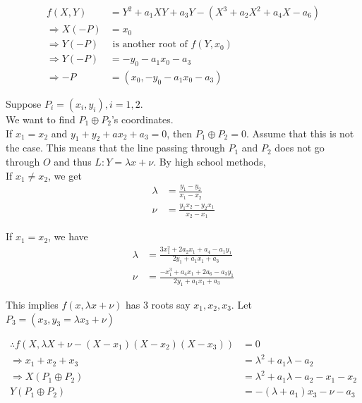 \documentclass[oneside, 12pt, ]{scrbook}
\theoremstyle{theorem}
\begin{document}
\begin{align*}
f(X,Y) &= Y^2 + a_{1}XY + a_{3}Y - (X^3 + a_{2}X^2 + a_{4}X - a_{6})\\
\Rightarrow X(-P) &= x_{0}\\
\Rightarrow Y(-P) &\text{ is another root of } f(Y,x_{0}) \\
\Rightarrow Y(-P) &= -y_{0} - a_{1}x_{0} -a_{3} \\
\Rightarrow -P &= (x_{0}, -y_{0}-a_{1}x_{0} - a_{3}) 
\end{align*}

Suppose $P_{i} = (x_{i},y_{i}), i=1,2$. \\

We want to find $P_{1} \oplus P_{2}$'s coordinates. \\

If $x_{1}=x_{2}$ and $y_{1} + y_{2} + ax_{2} + a_{3}=0$, then $P_{1} \oplus P_{2} = 0$. Assume that this is not the case. This means that the line passing through $P_{1}$ and $P_{2}$ does not go through $O$ and thus $L: Y = \lambda x + \nu$. By high school methods, \\

If $x_{1}\neq x_{2}$, we get 
\begin{align*}
\lambda &= \frac{y_{1}-y_{2}}{x_{1}-x_{2}} \\
\nu &= \frac{y_{1}x_{2} - y_{2}x_{1}}{x_{2}-x_{1}} 
\end{align*}

If $x_{1} = x_{2}$, we have 
\begin{align*}
\lambda &= \frac{3x_{1}^2 + 2a_{2}x_{1} + a_{4} - a_{1}y_{1}}{2y_{1} + a_{1}x_{1} + a_{3}} \\
\nu &= \frac{-x_{1}^3 + a_{4}x_{1} +2a_{6} -a_{3}y_{1}}{2y_{1} + a_{1}x_{1} + a_{3}}
\end{align*}

This implies $f(x, \lambda x + \nu)$ has $3$ roots say $x_{1},x_{2},x_{3}$. Let $P_{3}=(x_{3}, y_{3} = \lambda x_{3} + \nu)$

\begin{align*}
\therefore f(X,\lambda X + \nu -(X-x_{1})(X-x_{2})(X-x_{3}) ) &= 0\\
\Rightarrow x_{1} + x_{2} + x_{3} &= \lambda^2 + a_{1}\lambda - a_{2} \\
\Rightarrow X(P_{1}\oplus P_{2}) &= \lambda^2 + a_{1}\lambda - a_{2} - x_{1} - x_{2} \\
Y(P_{1} \oplus P_{2}) &= -(\lambda + a_{1})x_{3} - \nu -a_{3}
\end{align*}
\end{document}
